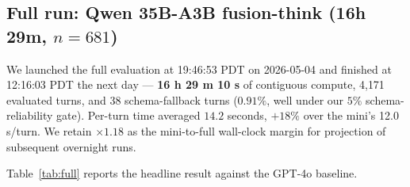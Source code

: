 \documentclass[11pt]{article}
\begin{document}
\begin{table}[t]
  \centering
  \small
  \caption{Mini gate: per-stage state accuracy for Qwen 35B-A3B fusion-think ($n{=}25$, 145 turns) versus the GPT-4o baseline ($n{=}681$, 4{,}294 turns). Multi-$\times$ lifts on stages c, d, e — the harder pedagogical work — meet the promotion criterion.}
  \label{tab:mini}
\end{table}

\subsection{Full run: Qwen 35B-A3B fusion-think (16h 29m, \texorpdfstring{$n{=}681$}{n=681})}
\label{sec:full}

We launched the full evaluation at 19:46:53 PDT on 2026-05-04 and finished at 12:16:03 PDT the next day --- \textbf{16 h 29 m 10 s} of contiguous compute, 4{,}171 evaluated turns, and 38 schema-fallback turns ($0.91\%$, well under our $5\%$ schema-reliability gate). Per-turn time averaged $14.2$ seconds, $+18\%$ over the mini's 12.0\,s/turn. We retain $\times 1.18$ as the mini-to-full wall-clock margin for projection of subsequent overnight runs.

Table~\ref{tab:full} reports the headline result against the GPT-4o baseline.
\end{document}
